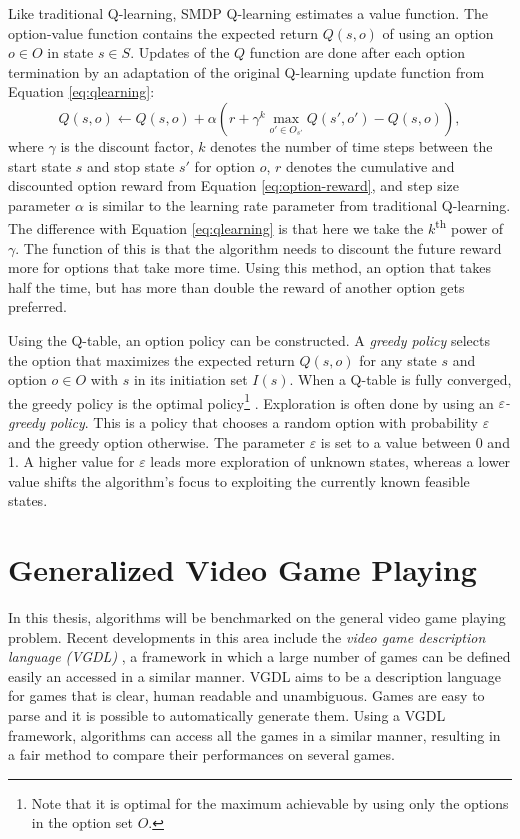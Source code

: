 Like traditional Q-learning, SMDP Q-learning estimates a value function. The
option-value function contains the expected return $Q(s, o)$ of using an option
$o \in O$ in state $s \in S$. Updates of the $Q$ function are done after each
option termination by an adaptation of the original Q-learning update function
from Equation \ref{eq:qlearning}:
\begin{equation}
	\label{eq:smdp-qlearning}
	Q(s, o) \gets Q(s, o) + \alpha \left(r + \gamma^k \max_{o' \in O_{s'}}Q(s',
	o') - Q(s, o)\right),
\end{equation}
where $\gamma$ is the discount factor, $k$ denotes the number of time steps
between the start state $s$ and stop state $s'$ for option $o$, $r$ denotes
the cumulative and discounted option reward from Equation
\ref{eq:option-reward}, and step size parameter $\alpha$ is similar to the
learning rate parameter from traditional Q-learning.  The difference with
Equation \ref{eq:qlearning} is that here we take the $k$\textsuperscript{th}
power of $\gamma$. The function of this is that the algorithm needs to discount
the future reward more for options that take more time. Using this method, an
option that takes half the time, but has more than double the reward of another
option gets preferred.

Using the Q-table, an option policy can be constructed. A \emph{greedy policy}
selects the option that maximizes the expected return $Q(s, o)$ for any state
$s$ and option $o \in O$ with $s$ in its initiation set $I(s)$. When a Q-table
is fully converged, the greedy policy is the optimal policy\footnote{Note that
it is optimal for the maximum achievable by using only the options in the option
set $O$.} \cite{sutton1999between}. Exploration is often done by using an
\emph{$\varepsilon$-greedy policy}. This is a policy that chooses a random option
with probability $\varepsilon$ and the greedy option otherwise. The parameter
$\varepsilon$ is set to a value between 0 and 1. A higher value for $\varepsilon$
leads more exploration of unknown states, whereas a lower value shifts the
algorithm's focus to exploiting the currently known feasible states.

\section{Generalized Video Game Playing}
\label{subsec:vgdl}

In this thesis, algorithms will be benchmarked on the general video game playing
problem. Recent developments in this area include the \emph{video game
description language (VGDL)} \cite{schaul2013video}, a framework in which a
large number of games can be defined easily an accessed in a similar manner.
VGDL aims to be a description language for games that is clear, human readable
and unambiguous. Games are easy to parse and it is possible to automatically
generate them. Using a VGDL framework, algorithms can access all the games in a
similar manner, resulting in a fair method to compare their performances on
several games.

